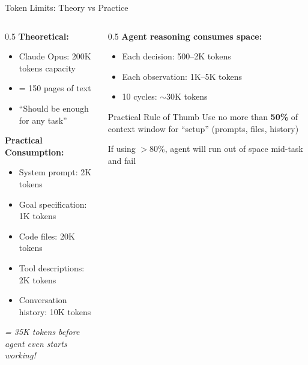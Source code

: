 \documentclass[aspectratio=169, 11pt]{beamer}
\begin{document}
\begin{frame}{Token Limits: Theory vs Practice}
    \begin{columns}[T]
        \begin{column}{0.5\textwidth}
            \textbf{Theoretical:}
            \begin{itemize}
                \item Claude Opus: 200K tokens capacity
                \item = 150 pages of text
                \item ``Should be enough for any task''
            \end{itemize}

            \vspace{0.3cm}
            \textbf{Practical Consumption:}
            \begin{itemize}
                \item System prompt: 2K tokens
                \item Goal specification: 1K tokens
                \item Code files: 20K tokens
                \item Tool descriptions: 2K tokens
                \item Conversation history: 10K tokens
            \end{itemize}

            \textit{= 35K tokens before agent even starts working!}
        \end{column}
        \begin{column}{0.5\textwidth}
            \textbf{Agent reasoning consumes space:}
            \begin{itemize}
                \item Each decision: 500--2K tokens
                \item Each observation: 1K--5K tokens
                \item 10 cycles: $\sim$30K tokens
            \end{itemize}

            \vspace{0.3cm}
            \begin{alertblock}{Practical Rule of Thumb}
                Use no more than \textbf{50\%} of context window for ``setup'' (prompts, files, history)

                \vspace{0.2cm}
                If using $>$80\%, agent will run out of space mid-task and fail
            \end{alertblock}
        \end{column}
    \end{columns}

\end{frame}
\end{document}
